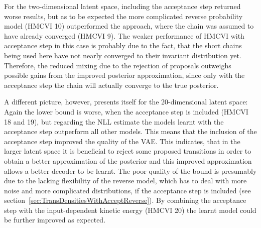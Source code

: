 For the two-dimensional latent space, including the acceptance step returned worse results, but as to be expected the more complicated reverse probability model (HMCVI 10) outperformed the approach, where the chain was assumed to have already converged (HMCVI 9). The weaker performance of HMCVI with acceptance step in this case is probably due to the fact, that the short chains being used here have not nearly converged to their invariant distribution yet. Therefore, the reduced mixing due to the rejection of proposals outweighs possible gains from the improved posterior approximation, since only with the acceptance step the chain will actually converge to the true posterior. 

A different picture, however, presents itself for the 20-dimensional latent space: Again the lower bound is worse, when the acceptance step is included (HMCVI 18 and 19), but regarding the NLL estimate the models learnt with the acceptance step outperform all other models. This means that the inclusion of the acceptance step improved the quality of the VAE. This indicates, that in the larger latent space it is beneficial to reject some proposed transitions in order to obtain a better approximation of the posterior and this improved approximation allows a better decoder to be learnt. The poor quality of the bound is presumably due to the lacking flexibility of the reverse model, which has to deal with more noise and more complicated distributions, if the acceptance step is included (see section~\ref{sec:TransDensitiesWithAcceptReverse}). By combining the acceptance step with the input-dependent kinetic energy (HMCVI 20) the learnt model could be further improved as expected.